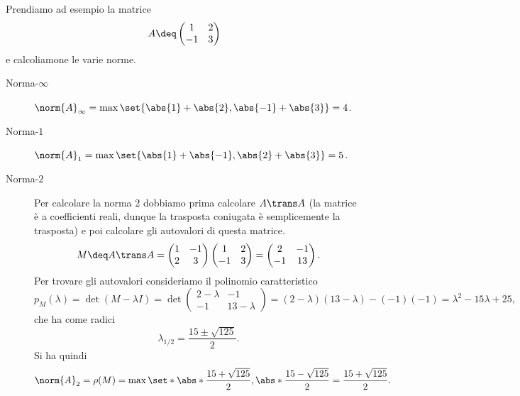 \begin{example}
    Prendiamo ad esempio la matrice \[
        A \deq \begin{pmatrix}
            1 & 2\\
            -1 & 3
        \end{pmatrix}
    \] e calcoliamone le varie norme.
    \begin{description}
        \item[Norma-$\infty$] $\norm{A}_\infty = \max\set{\abs{1} + \abs{2}, \abs{-1} + \abs{3}} = 4$.
        \item[Norma-$1$] $\norm{A}_1 = \max\set{\abs{1} + \abs{-1}, \abs{2} + \abs{3}} = 5$.
        \item[Norma-$2$] Per calcolare la norma $2$ dobbiamo prima calcolare $A\trans A$ (la matrice è a coefficienti reali, dunque la trasposta coniugata è semplicemente la trasposta) e poi calcolare gli autovalori di questa matrice. \begin{equation*}
            M \deq A\trans A = \begin{pmatrix}
                1 & -1\\ 2 & 3
            \end{pmatrix}\begin{pmatrix}
                1 & 2\\
                -1 & 3
            \end{pmatrix} = \begin{pmatrix}
                2 & -1\\
                -1 & 13
            \end{pmatrix}.
        \end{equation*} Per trovare gli autovalori consideriamo il polinomio caratteristico \[
            p_M(\lambda) = \det (M - \lambda I) = \det \begin{pmatrix}
                2-\lambda& -1\\
                -1 & 13-\lambda
            \end{pmatrix} = (2-\lambda)(13 -\lambda) - (-1)(-1) = \lambda^2 - 15\lambda + 25,
        \] che ha come radici \[
            \lambda_{1/2} = \frac{15 \pm \sqrt{125}}{2}.
        \]
        Si ha quindi \[
            \norm{A}_2 = \rho(M) = \max \set*{\abs*{\frac{15 + \sqrt{125}}{2}}, \abs*{\frac{15 - \sqrt{125}}{2}}} = \frac{15 + \sqrt{125}}{2}.
        \]
    \end{description}
\end{example}